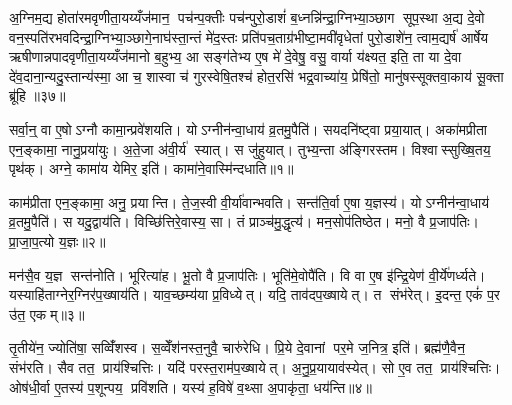 अ॒ग्निम॒द्य होता॑रमवृणीता॒यय्यँज॑मान॒ पच॑न्प॒क्तीः पच॑न्पुरो॒डाशं॑ ब॒ध्नन्नि॑न्द्रा॒ग्निभ्या॒ञ्छाग सूप॒स्था अ॒द्य दे॒वो वन॒स्पति॑रभवदिन्द्रा॒ग्निभ्या॒ञ्छागे॒नाघ॑स्ता॒न्तं मे॑द॒स्तः प्रति॑पच॒ताग्र॑भीष्टा॒मवी॑वृधेतां पुरो॒डाशे॑न॒ त्वाम॒द्यर्\mbox{}ष॑ आर्\mbox{}षेय ऋषीणान्नपादवृणीता॒यय्यँज॑मानो ब॒हुभ्य॒ आ सङ्ग॑तेभ्य ए॒ष मे॑ दे॒वेषु॒ वसु॒ वार्या य॑क्ष्यत॒ इति॒ ता या दे॒वा दे॑व॒दाना॒न्यदु॒स्तान्य॑स्मा॒ आ च॒ शास्वा च॑ गुरस्वेषि॒तश्च॑ होत॒रसि॑ भद्र॒वाच्या॑य॒ प्रेषि॑तो॒ मानु॑षस्सूक्तवा॒काय॑ सू॒क्ता ब्रू॑हि ॥३७॥\anuvakamend[अ॒ग्निम॒द्यैकम्]





\clearpage
{}
\setcounter{anuvakam}{0}
सर्वा॒न्॒ वा ए॒षोऽग्नौ कामा॒न्प्रवे॑शयति। योऽग्नीन॑न्वा॒धाय॑ व्र॒तमु॒पैति॑। सयदनि॑ष्ट्वा प्रया॒यात्। अका॑मप्रीता एन॒ङ्कामा॒ नानु॒प्रया॑युः। अ॒ते॒जा अ॑वी॒र्य॑ स्यात्। स जु॑हुयात्। तुभ्य॒न्ता अ॑ङ्गिरस्तम। विश्वास्सुख्षि॒तय॒ पृथ॑क्। अग्ने॒ कामा॑य येमिर॒ इति॑। कामा॑ने॒वास्मि॑न्दधाति॥१॥

काम॑प्रीता एन॒ङ्कामा॒ अनु॒ प्रयान्ति। ते॒ज॒स्वी वी॒र्या॑वान्भवति। सन्त॑ति॒र्वा ए॒षा य॒ज्ञस्य॑। योऽग्नीन॑न्वा॒धाय॑ व्र॒तमु॒पैति॑। स यदु॒द्वाय॑ति। विच्छि॑त्तिरे॒वास्य॒ सा। तं प्राञ्च॑मु॒द्धृत्य॑। मन॒सोप॑तिष्ठेत। मनो॒ वै प्र॒जाप॑तिः। प्रा॒जा॒प॒त्यो य॒ज्ञः॥२॥

मन॑सै॒व य॒ज्ञ सन्त॑नोति। भूरित्या॑ह। भू॒तो वै प्र॒जाप॑तिः। भूति॑मे॒वोपै॑ति। वि वा ए॒ष इ॑न्द्रि॒येण॑ वी॒र्ये॑णर्ध्यते। यस्याहि॑ताग्नेर॒ग्निर॑प॒ख्षाय॑ति। याव॒च्छम्य॑या प्र॒विध्येत्। यदि॒ ताव॑दप॒ख्षायेत्। त संभ॑रेत्। इ॒दन्त॒ एकं॑ प॒र उ॑त॒ एकम्॥३॥

तृ॒तीये॑न॒ ज्योति॑षा॒ सव्विँ॑शस्व। स॒व्वेँश॑नस्त॒नुवै॒ चारु॑रेधि। प्रि॒ये दे॒वानां पर॒मे ज॒नित्र॒ इति॑। ब्रह्म॑णै॒वैन॒ संभ॑रति। सैव तत॒ प्राय॑श्चित्तिः। यदि॑ परस्त॒राम॑प॒ख्षायेत्। अ॒नु॒प्र॒यायाव॑स्येत्। सो ए॒व तत॒ प्राय॑श्चित्तिः। ओष॑धी॒र्वा ए॒तस्य॑ प॒शून्पय॒ प्रवि॑शति। यस्य॑ ह॒विषे॑ व॒थ्सा अ॒पाकृ॑ता॒ धय॑न्ति॥४॥


